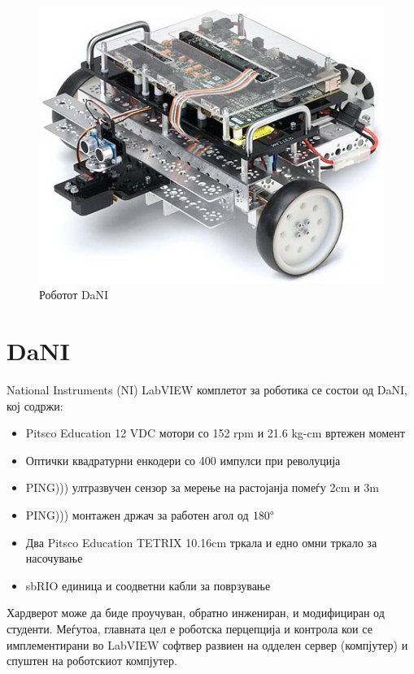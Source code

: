 \documentclass{article}
\begin{document}
\begin{figure}[H]
\includegraphics[width=0.75\linewidth]{dani_isometric.jpg}
\centering
\caption{Роботот DaNI}
\label{fig:dani_isometric.jpg}
\end{figure} 

\newpage

\section{DaNI}

National Instruments (NI) LabVIEW комплетот за роботика се состои од DaNI, кој содржи:
\begin{itemize}
	\item Pitsco Education 12 VDC мотори со 152 rpm и 21.6 kg-cm вртежен момент
	\item Оптички квадратурни енкодери со 400 импулси при револуција
	\item PING))) ултразвучен сензор за мерење на растојанја помеѓу 2cm и 3m
	\item PING))) монтажен држач за работен агол од $180 \degree$
	\item Два Pitsco Education TETRIX 10.16cm тркала и едно омни тркало за насочување
	\item sbRIO единица и соодветни кабли за поврзување
\end{itemize}

Хардверот може да биде проучуван, обратно инжениран, и модифициран од студенти. Меѓутоа, главната цел е роботска перцепција и контрола кои се имплементирани во LabVIEW софтвер развиен на одделен сервер (компјутер) и спуштен на роботскиот компјутер.
\end{document}
